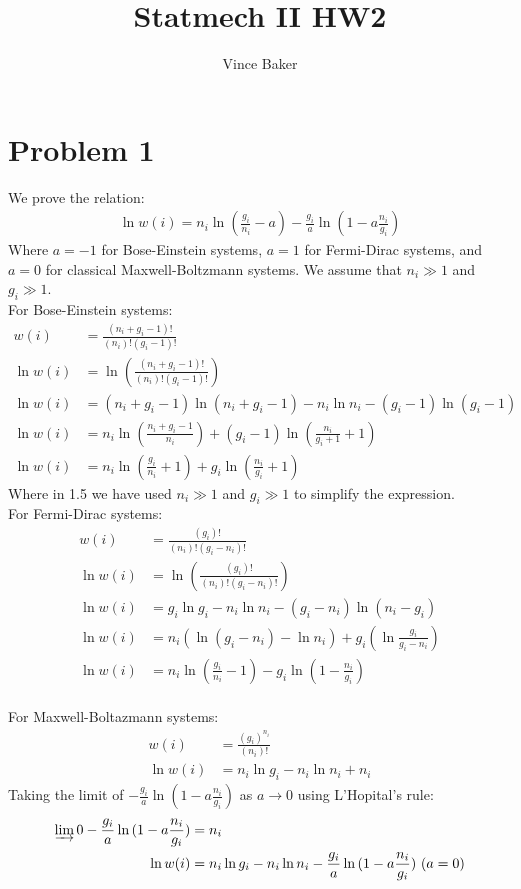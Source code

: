 \documentclass[a4paper,11pt]{article}
\title{Statmech II HW2}
\author{Vince Baker}
\numberwithin{equation}{section}
\begin{document}
\maketitle

\section{Problem 1}
We prove the relation:
\begin{align}
 \ln{w(i)} = n_i\ln{(\frac{g_i}{n_i}-a)}-\frac{g_i}{a}\ln{(1-a\frac{n_i}{g_i})}
\end{align}
Where $a=-1$ for Bose-Einstein systems, $a=1$ for Fermi-Dirac systems, and $a=0$ for classical Maxwell-Boltzmann systems.
We assume that $n_i\gg 1$ and $g_i \gg 1$.\\
For Bose-Einstein systems:
\begin{align}
 w(i) &= \frac{(n_i+g_i-1)!}{(n_i)!(g_i-1)!}\\
 \ln{w(i)} &= \ln{\left(\frac{(n_i+g_i-1)!}{(n_i)!(g_i-1)!} \right)}\\
 \ln{w(i)} &= (n_i+g_i-1)\ln{(n_i+g_i-1)}-n_i\ln{n_i}-(g_i-1)\ln{(g_i-1)}\\
 \ln{w(i)} &= n_i\ln{\left(\frac{n_i+g_i-1}{n_i}\right)} +(g_i-1)\ln{(\frac{n_i}{g_i+1}+1)}\\
 \ln{w(i)} &= n_i\ln{\left(\frac{g_i}{n_i}+1\right)} +g_i\ln{(\frac{n_i}{g_i}+1)}
\end{align}
Where in 1.5 we have used $n_i\gg 1$ and $g_i \gg 1$ to simplify the expression.
\\
For Fermi-Dirac systems:
\begin{align}
  w(i) &= \frac{(g_i)!}{(n_i)!(g_i-n_i)!}\\
 \ln{w(i)} &= \ln{\left(\frac{(g_i)!}{(n_i)!(g_i-n_i)!} \right)}\\
 \ln{w(i)} &= g_i\ln{g_i}-n_i\ln{n_i}-(g_i-n_i)\ln{(n_i-g_i)}\\
 \ln{w(i)} &= n_i\left(\ln{(g_i-n_i)}-\ln{n_i} \right)+g_i\left(\ln{\frac{g_i}{g_i-n_i}} \right)\\
 \ln{w(i)} &= n_i\ln{\left(\frac{g_i}{n_i}-1 \right)}-g_i\ln{\left(1-\frac{n_i}{g_i} \right)}
\end{align}
\\
For Maxwell-Boltazmann systems:
\begin{align}
  w(i) &= \frac{(g_i)^{n_i}}{(n_i)!}\\
 \ln{w(i)} &= n_i\ln{g_i}-n_i\ln{n_i}+n_i
\end{align}
Taking the limit of $-\frac{g_i}{a}\ln{(1-a\frac{n_i}{g_i})} $ as $a \rightarrow 0$ using L'Hopital's rule:
\begin{align}
 \varinjlim 0 -\frac{g_i}{a}\ln{(1-a\frac{n_i}{g_i})} &= n_i\\
 \ln{w(i)} &= n_i\ln{g_i}-n_i\ln{n_i}-\frac{g_i}{a}\ln{(1-a\frac{n_i}{g_i})}\ (a=0)
\end{align}
\\
\end{document}
